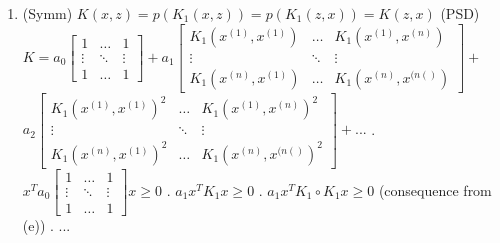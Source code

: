 \begin{answer}
\begin{enumerate}
\item 
\subitem  (Symm) $K(x,z) = p(K_1(x, z)) = p(K_1(z, x))= K(z,x)$
\subitem (PSD) $
K = 
a_0\begin{bmatrix}
    1 & \dots  & 1 \\
    \vdots & \ddots & \vdots \\
    1 & \dots  & 1
\end{bmatrix} + 
a_1\begin{bmatrix}
    K_1(x^{(1)},x^{(1)}) & \dots  & K_1(x^{(1)},x^{(n)})  \\
    \vdots & \ddots & \vdots \\
    K_1(x^{(n)},x^{(1)})  & \dots  & K_1(x^{(n)},x^{(n()}) 
\end{bmatrix} + $ \\
$
a_2\begin{bmatrix}
    K_1(x^{(1)},x^{(1)})^2 & \dots  & K_1(x^{(1)},x^{(n)})^2  \\
    \vdots & \ddots & \vdots \\
    K_1(x^{(n)},x^{(1)})^2  & \dots  & K_1(x^{(n)},x^{(n()})^2
\end{bmatrix}   + ...
$
. $x^Ta_0\begin{bmatrix}
    1 & \dots  & 1 \\
    \vdots & \ddots & \vdots \\
    1 & \dots  & 1
\end{bmatrix}x \ge 0 $
. $a_1 x^T K_1 x \ge 0$
. $a_1 x^T K_1 \circ K_1 x \ge 0$ (consequence from (e))
. ...
\end{enumerate}

\end{answer}
